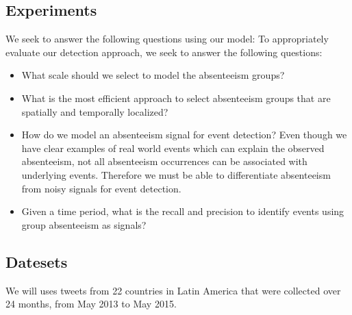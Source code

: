 \subsection{Experiments}
We seek to answer the following questions using our model:
To appropriately evaluate our detection approach, we seek to answer the following questions:
\begin{itemize}
\item What scale should we select to model the absenteeism groups? %
\item What is the most efficient approach to select absenteeism groups that are spatially and temporally localized?
\item How do we model an absenteeism signal for event detection? Even though we have clear examples of real world events which can explain the observed absenteeism, not all absenteeism occurrences can be associated with underlying events. Therefore we must be able to differentiate absenteeism from noisy signals for event detection.
\item Given a time period, what is the recall and precision to identify events using group absenteeism as signals?
\end{itemize}
\subsection{Datesets}
We will uses tweets from 22 countries in Latin America that were collected over 24 months, from May 2013 to May 2015.

